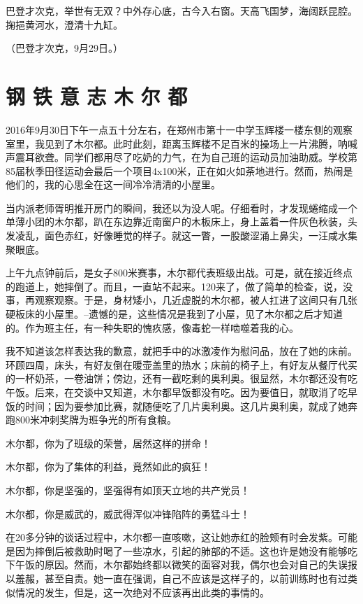 \documentclass[openany]{ctexbook}
\begin{document}
巴登才次克，举世有无双？中外存心底，古今入右窗。天高飞国梦，海阔跃昆腔。掬挹黄河水，澄清十九缸。

（巴登才次克，9月29日。）

\chapter*{钢 铁 意 志 木 尔 都}\label{muerdu}

2016年9月30日下午一点五十分左右，在郑州市第十一中学玉辉楼一楼东侧的观察室里，我见到了木尔都。此时此刻，距离玉辉楼不足百米的操场上一片沸腾，呐喊声震耳欲聋。同学们都用尽了吃奶的力气，在为自己班的运动员加油助威。学校第85届秋季田径运动会最后一个项目4x100米，正在如火如荼地进行。然而，热闹是他们的，我的心思全在这一间冷冷清清的小屋里。

当内派老师胥明推开房门的瞬间，我还以为没人呢。仔细看时，才发现蜷缩成一个单薄小团的木尔都，趴在东边靠近南窗户的木板床上，身上盖着一件灰色秋装，头发凌乱，面色赤红，好像睡觉的样子。就这一瞥，一股酸涩涌上鼻尖，一汪咸水集聚眼底。

上午九点钟前后，是女子800米赛事，木尔都代表班级出战。可是，就在接近终点的跑道上，她摔倒了。而且，一直站不起来。120来了，做了简单的检查，说，没事，再观察观察。于是，身材矮小，几近虚脱的木尔都，被人扛进了这间只有几张硬板床的小屋里。--遗憾的是，这些情况是我到了小屋，见了木尔都之后才知道的。作为班主任，有一种失职的愧疚感，像毒蛇一样啮噬着我的心。

我不知道该怎样表达我的歉意，就把手中的冰激凌作为慰问品，放在了她的床前。环顾四周，床头，有好友倒在暖壶盖里的热水；床前的椅子上，有好友从餐厅代买的一杯奶茶，一卷油饼；傍边，还有一截吃剩的奥利奥。很显然，木尔都还没有吃午饭。后来，在交谈中又知道，木尔都早饭都没有吃。因为要值日，就取消了吃早饭的时间；因为要参加比赛，就随便吃了几片奥利奥。这几片奥利奥，就成了她奔跑800米冲刺奖牌为班争光的所有食粮。

木尔都，你为了班级的荣誉，居然这样的拼命！

木尔都，你为了集体的利益，竟然如此的疯狂！

木尔都，你是坚强的，坚强得有如顶天立地的共产党员！

木尔都，你是威武的，威武得浑似冲锋陷阵的勇猛斗士！

在20多分钟的谈话过程中，木尔都一直咳嗽，这让她赤红的脸颊有时会发紫。可能是因为摔倒后被救助时喝了一些凉水，引起的肺部的不适。这也许是她没有能够吃下午饭的原因。然而，木尔都始终都以微笑的面容对我，偶尔也会对自己的失误报以羞赧，甚至自责。她一直在强调，自己不应该是这样子的，以前训练时也有过类似情况的发生，但是，这一次绝对不应该再出此类的事情的。
\end{document}
